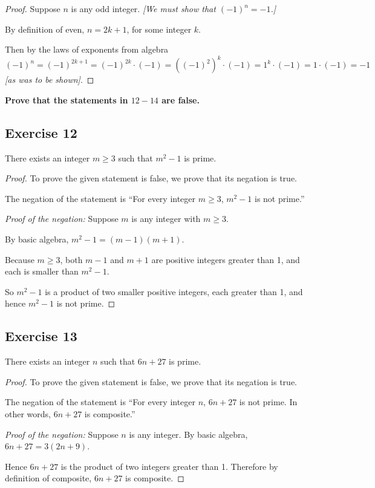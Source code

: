 \documentclass[14pt]{extarticle}
\begin{document}
\begin{proof}
Suppose $n$ is any odd integer. {\it [We must show that $(-1)^n = -1$.]}

By definition of even, $n = 2k+1$, for some integer $k$. 

Then by the laws of exponents from algebra 
$$
(-1)^n = (-1)^{2k+1} = (-1)^{2k}\cdot(-1) = ((-1)^2)^k\cdot(-1) = 1^k\cdot(-1) = 1\cdot(-1) = -1
$$ 
{\it [as was to be shown]}.
\end{proof}

{\bf \color{cyan} Prove that the statements in $12-14$ are false.}

\subsection{Exercise 12}
There exists an integer $m \geq 3$ such that $m^2 - 1$ is prime.

\begin{proof}
To prove the given statement is false, we prove that its
negation is true.

The negation of the statement is “For every integer $m \geq 3$, $m^2 - 1$ is not prime.”

{\it Proof of the negation:} Suppose $m$ is any integer with $m \geq 3$. 

By basic algebra, $m^2 - 1 = (m - 1)(m + 1)$. 

Because $m \geq 3$, both $m - 1$ and $m + 1$ are positive integers greater than 1, and each is smaller than $m^2 - 1$. 

So $m^2 - 1$ is a product of two smaller positive integers, each greater than 1, and hence $m^2 - 1$ is not prime.
\end{proof}

\subsection{Exercise 13}
There exists an integer $n$ such that $6n + 27$ is prime.

\begin{proof}
To prove the given statement is false, we prove that its
negation is true.

The negation of the statement is “For every integer $n$, $6n+27$ is not prime. In other words, $6n+27$ is composite.”

{\it Proof of the negation:} Suppose $n$ is any integer. 
By basic algebra, $6n + 27 = 3(2n + 9)$. 

Hence $6n+27$ is the product of two integers greater than 1. Therefore by definition of composite, $6n+27$ is composite.
\end{proof}
\end{document}
